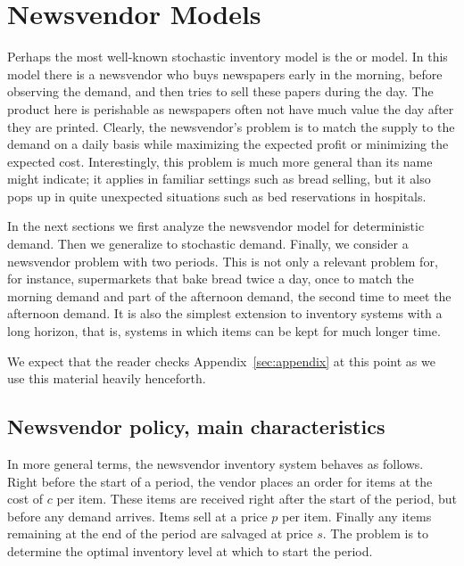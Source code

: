 \newcommand{\Q}{S}

\section{Newsvendor Models}
\label{sec:newsvendor-models}




Perhaps the most well-known stochastic inventory model is the  or  model.  In this model there is a  newsvendor who buys newspapers early in the morning, before observing the demand, and then tries to sell these papers during the day. 
The product here is perishable as newspapers often not have much value the day after they are printed. %
Clearly,  the newsvendor's problem is to match the supply to the demand on a daily basis while maximizing the expected profit or minimizing the expected cost. Interestingly, this problem is much more general than its name might indicate; it applies in familiar settings such as bread selling, but it also pops up  in quite unexpected situations such as bed reservations in hospitals. 


In the next sections we first analyze the newsvendor model for deterministic demand. Then we generalize to stochastic demand.
Finally, we consider a newsvendor problem with two periods. This is not only a relevant problem for, for instance, supermarkets that bake bread twice a day, once to match the morning demand and part of the afternoon demand, the second time to meet the afternoon demand. It is also the simplest extension to inventory systems with a long horizon, that is, systems in which items can be kept for much longer time. 

We expect that the reader checks Appendix~\ref{sec:appendix} at this point as we use this material heavily henceforth.

\subsection{Newsvendor policy, main characteristics}
\label{sec:policy-parameters}

In more general terms, the newsvendor  inventory system behaves as follows. Right before the start of a period, the vendor places an order for items at the cost of $c$ per item. These items are received right after the start of the period, but before any demand arrives. Items sell at a price $p$ per item. Finally any items remaining at the end of the period are salvaged at price $s$. The problem is to determine the optimal inventory level at which to start the period. 

